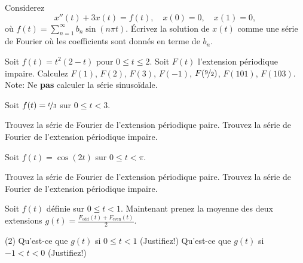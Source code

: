 \begin{exercise}
Considerez
\begin{equation*}
x''(t) + 3 x(t) = f(t) , \quad x(0) = 0, \quad x(1) = 0,
\end{equation*}
où $f(t) = \sum_{n=1}^\infty b_n \sin (n \pi t)$.  Écrivez la solution de $x(t)$
comme une série de Fourier où les coefficients sont donnés en terme de $b_n$.
\end{exercise}

\begin{exercise}
Soit $f(t) = t^2(2-t)$ pour $0 \leq t \leq 2$.  Soit $F(t)$ l'extension périodique impaire.  Calculez $F(1)$, $F(2)$, $F(3)$, $F(-1)$, $F(\nicefrac{9}{2})$,
$F(101)$, $F(103)$.  Note: Ne \textbf{pas} calculer la série sinusoïdale. 
\end{exercise}

\setcounter{exercise}{100}

\begin{exercise}
Soit $f(t) = \nicefrac{t}{3}$ sur $0 \leq t < 3$.
\begin{tasks}
\task Trouvez la série de Fourier de l'extension périodique paire.
\task Trouvez la série de Fourier de l'extension périodique impaire.
\end{tasks}
\end{exercise}

\begin{exercise}
Soit $f(t) = \cos(2t)$ sur $0 \leq t < \pi$.
\begin{tasks}
\task Trouvez la série de Fourier de l'extension périodique paire.
\task Trouvez la série de Fourier de l'extension périodique impaire.
\end{tasks}
\end{exercise}

\begin{exercise}
Soit $f(t)$ définie sur $0 \leq t < 1$.  Maintenant prenez
la moyenne des deux extensions
$g(t) = \frac{F_{\text{odd}}(t)+ F_{\text{even}}(t)}{2}$.
\begin{tasks}(2)
\task Qu'est-ce que $g(t)$ si $0 \leq t < 1$ (Justifiez!)
\task Qu'est-ce que $g(t)$ si $-1 < t < 0$ (Justifiez!)
\end{tasks}
\end{exercise}


